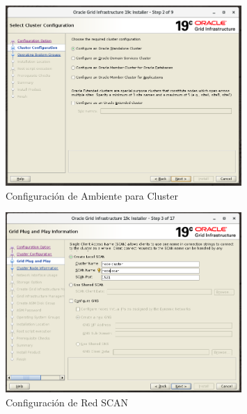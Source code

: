 \documentclass{article}
\begin{document}
\begin{figure}[H]
		\begin{center}
			\includegraphics[width=0.80\textwidth]{grid_install_02_cluster_configuration.png}
		\end{center}
		\caption{Configuración de Ambiente para Cluster}
\end{figure}

\begin{figure}[H]
		\begin{center}
			\includegraphics[width=0.80\textwidth]{grid_install_03_grid_plug_and_play.png}
		\end{center}
		\caption{Configuración de Red SCAN}
\end{figure}
\end{document}

